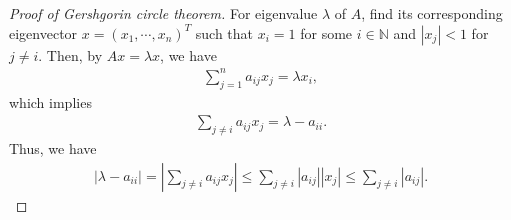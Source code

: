 \documentclass[11pt]{article}
\theoremstyle{definition}
\numberwithin{equation}{subsection}
\begin{document}
\begin{proof}[Proof of Gershgorin circle theorem]
For eigenvalue $\lambda$ of $A$, find its corresponding eigenvector $x = (x_1, \cdots, x_n)^T$ such that $x_i = 1$ for some $i \in \mathbb{N}$ and $\left|x_j\right| < 1$ for $j \neq i$. Then, by $Ax = \lambda x$, we have
\begin{align*}
    \sum^n_{j=1} a_{ij}x_j = \lambda x_i,
\end{align*}
which implies
\begin{align*}
    \sum_{j\neq i} a_{ij}x_j = \lambda - a_{ii}.
\end{align*}
Thus, we have
\begin{align*}
    \left|\lambda - a_{ii}\right| = \left|\sum_{j\neq i} a_{ij}x_j\right| \leq \sum_{j\neq i} \left|a_{ij}\right| \left|x_j\right| \leq \sum_{j\neq i} \left|a_{ij}\right|.
\end{align*}
\end{proof}


\newpage


\end{document}
